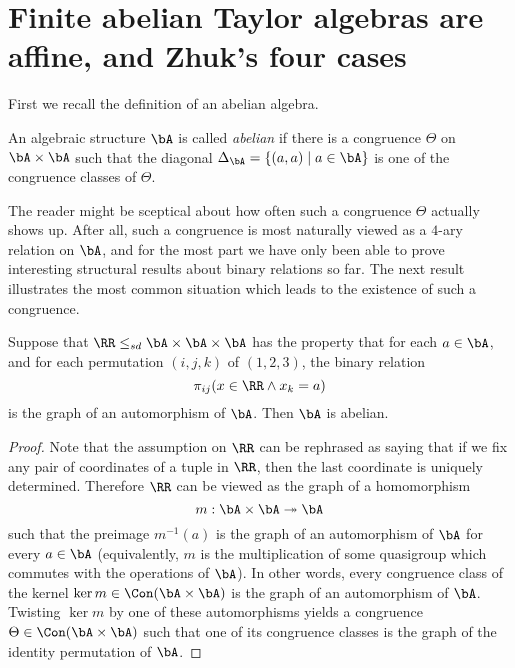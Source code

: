 


\section{Finite abelian Taylor algebras are affine, and Zhuk's four cases}

First we recall the definition of an abelian algebra.

\begin{defn} An algebraic structure $\bA$ is called \emph{abelian} if there is a congruence $\Theta$ on $\bA\times \bA$ such that the diagonal $\Delta_\bA = \{(a,a) \mid a \in \bA\}$ is one of the congruence classes of $\Theta$.
\end{defn}

The reader might be sceptical about how often such a congruence $\Theta$ actually shows up. After all, such a congruence is most naturally viewed as a $4$-ary relation on $\bA$, and for the most part we have only been able to prove interesting structural results about binary relations so far. The next result illustrates the most common situation which leads to the existence of such a congruence.

\begin{prop}\label{ternary-abelian} Suppose that $\RR \le_{sd} \bA \times \bA \times \bA$ has the property that for each $a \in \bA$, and for each permutation $(i,j,k)$ of $(1,2,3)$, the binary relation
\[
\pi_{ij}(x\in\RR \wedge x_k = a)
\]
is the graph of an automorphism of $\bA$. Then $\bA$ is abelian.
\end{prop}
\begin{proof} Note that the assumption on $\RR$ can be rephrased as saying that if we fix any pair of coordinates of a tuple in $\RR$, then the last coordinate is uniquely determined. Therefore $\RR$ can be viewed as the graph of a homomorphism
\[
m: \bA\times \bA \twoheadrightarrow \bA
\]
such that the preimage $m^{-1}(a)$ is the graph of an automorphism of $\bA$ for every $a \in \bA$ (equivalently, $m$ is the multiplication of some quasigroup which commutes with the operations of $\bA$). In other words, every congruence class of the kernel $\ker m \in \Con(\bA \times \bA)$ is the graph of an automorphism of $\bA$. Twisting $\ker m$ by one of these automorphisms yields a congruence $\Theta \in \Con(\bA\times \bA)$ such that one of its congruence classes is the graph of the identity permutation of $\bA$.
\end{proof}

